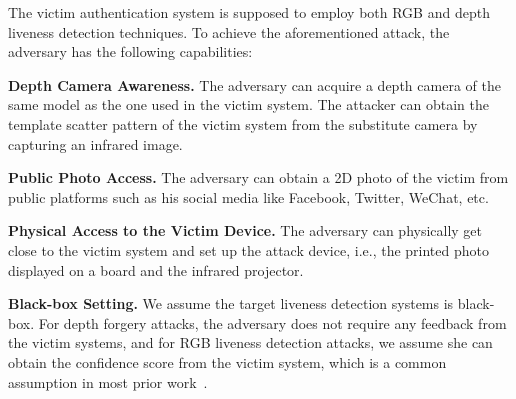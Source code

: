 The victim authentication system is supposed to employ both RGB and depth liveness detection techniques. To achieve the aforementioned attack, the adversary has the following capabilities:

\textbf{Depth Camera Awareness.}
The adversary can acquire a depth camera of the same model as the one used in the victim system. The attacker can obtain the template scatter pattern of the victim system from the substitute camera by capturing an infrared image.


\textbf{Public Photo Access.}
The adversary can obtain a  2D photo of the victim from  public platforms such as his social media like Facebook, Twitter, WeChat, etc.

\textbf{Physical Access to the Victim Device.} The adversary can physically get close to the victim system and set up the attack device, i.e., the printed photo displayed on a board and the infrared projector.


\textbf{Black-box Setting.} 
We assume the target liveness detection systems is black-box. For depth forgery attacks, the adversary does not require any feedback from the victim systems, and for RGB liveness detection attacks, we assume she can obtain the confidence score from the victim system, which is a common assumption in most prior work~\cite{guo2019simple, wei2022adversarial, sharif2016accessorize, andriushchenko2020square}.



